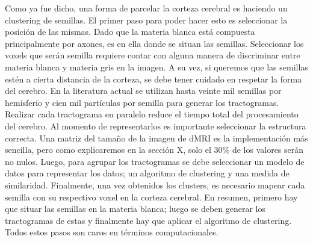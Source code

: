Como ya fue dicho, una forma de parcelar la corteza cerebral es haciendo un 
clustering de semillas.  El primer paso para poder hacer esto es seleccionar
la posici\'on de las mismas. Dado que la materia blanca est\'a compuesta
principalmente por axones, es en ella donde se situan las semillas. Seleccionar
los voxels que ser\'an semilla requiere contar con alguna manera de discriminar
entre materia blanca y materia gris en la imagen. A su vez, si queremos que las
semillas est\'en a cierta distancia de la corteza, se debe tener cuidado en
respetar la forma del cerebro. En la literatura actual se utilizan hasta veinte
mil semillas por hemisferio \cite{Moreno-Dominguez2014} y cien mil part\'iculas 
por semilla \cite{Anwander2006} para generar los tractogramas. Realizar cada
tractograma en paralelo reduce el tiempo total del procesamiento del cerebro. Al
momento de representarlos es importante seleccionar la estructura correcta. Una 
matriz del tama\~no de la imagen de dMRI es la implementaci\'on m\'as sencilla, 
pero como explicaremos en la secci\'on X, solo el 30\% de los valores ser\'an no
nulos. Luego, para agrupar los tractogramas se debe seleccionar un modelo de datos
para representar los datos; un algoritmo de clustering y una medida de similaridad.
Finalmente, una vez obtenidos los clusters, es necesario mapear cada semilla con
su respectivo voxel en la corteza cerebral. En resumen, primero hay que situar
las semillas en la materia blanca; luego se deben generar los tractogramas de 
estas y finalmente hay que aplicar el algoritmo de clustering. Todos estos pasos
son caros en t\'erminos computacionales. \\

